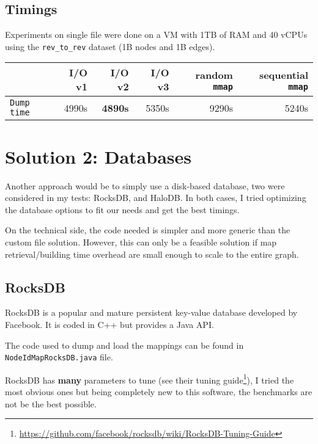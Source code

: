 \documentclass[11pt,a4paper]{article}
\newcommand{\mmap}{\texttt{mmap}}
\begin{document}
\subsection{Timings}

Experiments on single file were done on a VM with 1TB of RAM and 40 vCPUs using
the \texttt{rev_to_rev} dataset (1B nodes and 1B edges).

\begin{center}
    \begin{tabular}{@{} l *5r @{}}
        \toprule
        \multicolumn{1}{c}{} &
            \textbf{I/O v1} & \textbf{I/O v2} &
            \textbf{I/O v3} &
            \textbf{random \mmap{}} & \textbf{sequential \mmap{}} \\
        \midrule
        \texttt{Dump time}
            & 4990s & \textbf{4890s} & 5350s & 9290s & 5240s \\
        \bottomrule
    \end{tabular}
\end{center}


\section{Solution 2: Databases}

Another approach would be to simply use a disk-based database, two were
considered in my tests: RocksDB, and HaloDB. In both cases, I tried optimizing
the database options to fit our needs and get the best timings.

On the technical side, the code needed is simpler and more generic than the
custom file solution. However, this can only be a feasible solution if map
retrieval/building time overhead are small enough to scale to the entire graph.

\subsection{RocksDB}

RocksDB is a popular and mature persistent key-value database developed by
Facebook. It is coded in C++ but provides a Java API.

The code used to dump and load the mappings can be found in
\texttt{NodeIdMapRocksDB.java} file.

RocksDB has \textbf{many} parameters to tune (see their tuning
guide\footnote{\url{https://github.com/facebook/rocksdb/wiki/RocksDB-Tuning-Guide}}),
I tried the most obvious ones but being completely new to this software, the
benchmarks are not be the best possible.
\end{document}
